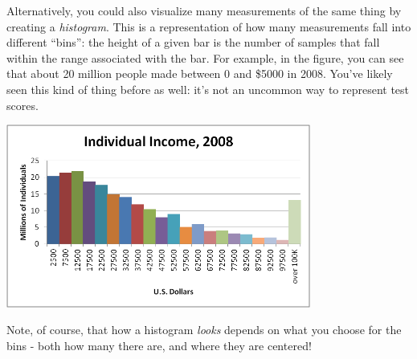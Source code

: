 Alternatively, you could also visualize many measurements of the same thing by creating a \textit{histogram}.  This is a representation of how many measurements fall into different ``bins'': the height of a given bar is the number of samples that fall within the range associated with the bar.  For example, in the figure, you can see that about 20 million people made between 0 and \$5000 in 2008.  You've likely seen this kind of thing before as well: it's not an uncommon way to represent test scores.

\begin{center}
\includegraphics[width=0.75\textwidth]{FacesNight3/figs/incomehistogram.png}
\label{fig:histogram}
\end{center}

Note, of course, that how a histogram \textit{looks} depends on what you choose for the bins - both how many there are, and where they are centered!

